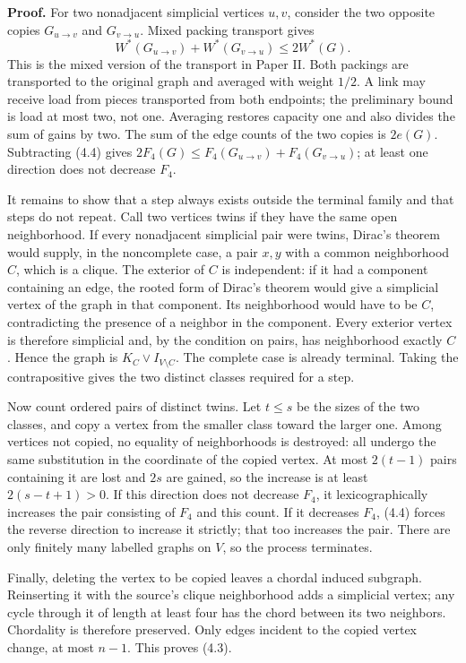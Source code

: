 \documentclass[english,11pt,a4paper]{article}
\begin{document}
\textbf{Proof.} For two nonadjacent simplicial vertices \(u,v\), consider the two opposite copies \(G_{u\to v}\) and \(G_{v\to u}\). Mixed packing transport gives \[
W^*(G_{u\to v})+W^*(G_{v\to u})\le2W^*(G).
\tag{4.4}
\] This is the mixed version of the transport in Paper II. Both packings are transported to the original graph and averaged with weight \(1/2\). A link may receive load from pieces transported from both endpoints; the preliminary bound is load at most two, not one. Averaging restores capacity one and also divides the sum of gains by two. The sum of the edge counts of the two copies is \(2e(G)\). Subtracting (4.4) gives \(2F_4(G)\le F_4(G_{u\to v})+F_4(G_{v\to u})\); at least one direction does not decrease \(F_4\).

It remains to show that a step always exists outside the terminal family and that steps do not repeat. Call two vertices twins if they have the same open neighborhood. If every nonadjacent simplicial pair were twins, Dirac's theorem would supply, in the noncomplete case, a pair \(x,y\) with a common neighborhood \(C\), which is a clique. The exterior of \(C\) is independent: if it had a component containing an edge, the rooted form of Dirac's theorem would give a simplicial vertex of the graph in that component. Its neighborhood would have to be \(C\), contradicting the presence of a neighbor in the component. Every exterior vertex is therefore simplicial and, by the condition on pairs, has neighborhood exactly \(C\). Hence the graph is \(K_C\vee I_{V\setminus C}\). The complete case is already terminal. Taking the contrapositive gives the two distinct classes required for a step.

Now count ordered pairs of distinct twins. Let \(t\le s\) be the sizes of the two classes, and copy a vertex from the smaller class toward the larger one. Among vertices not copied, no equality of neighborhoods is destroyed: all undergo the same substitution in the coordinate of the copied vertex. At most \(2(t-1)\) pairs containing it are lost and \(2s\) are gained, so the increase is at least \(2(s-t+1)>0\). If this direction does not decrease \(F_4\), it lexicographically increases the pair consisting of \(F_4\) and this count. If it decreases \(F_4\), (4.4) forces the reverse direction to increase it strictly; that too increases the pair. There are only finitely many labelled graphs on \(V\), so the process terminates.

Finally, deleting the vertex to be copied leaves a chordal induced subgraph. Reinserting it with the source's clique neighborhood adds a simplicial vertex; any cycle through it of length at least four has the chord between its two neighbors. Chordality is therefore preserved. Only edges incident to the copied vertex change, at most \(n-1\). This proves (4.3).
\end{document}
